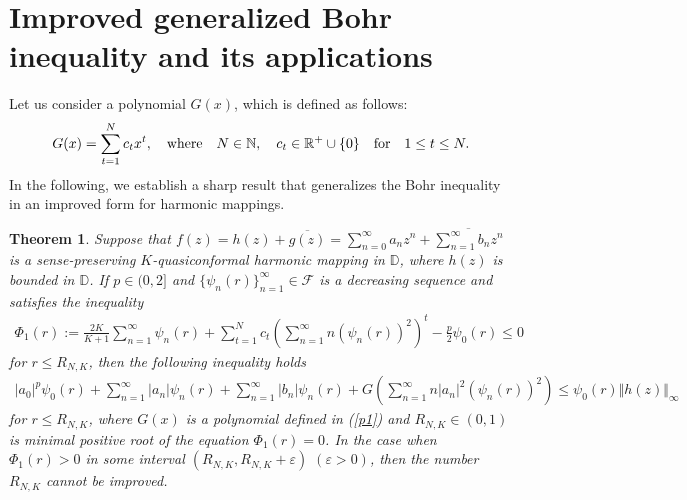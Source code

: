 \documentclass[11pt,reqno]{amsart}
\newtheorem{theo}{Theorem}[section]
\newtheorem{open problem}{Open problem}[section]
\newcommand{\F}{{\mathcal{F}}}
\newcommand{\N}{{\Bbb{N}}}
\newcommand{\R}{{\Bbb{R}}}
\newcommand{\ol}{\overline}
\newcommand{\beas}{\begin{eqnarray*}}
\newcommand{\eeas}{\end{eqnarray*}}
\newcommand{\bea}{\begin{eqnarray}}
\newcommand{\eea}{\end{eqnarray}}
\renewcommand{\epsilon}{\varepsilon}
\numberwithin{equation}{section}
\begin{document}
\section{Improved generalized Bohr inequality and its applications}
Let us consider a polynomial $G(x)$, which is defined as follows:
\bea\label{p1} G(x)=\sum_{t=1}^N c_t x^t,\quad \text{where}\quad N\in\N,\quad c_t\in\R^+\cup\{0\}\quad\text{for}\quad 1\leq t\leq N.\eea
In the following, we establish a sharp result that generalizes the Bohr inequality in an improved form for harmonic mappings.
\begin{theo}\label{T1} Suppose that $f(z)=h(z)+\ol{g(z)}=\sum_{n=0}^\infty a_n z^n+\ol{\sum_{n=1}^\infty b_n z^n}$ is a sense-preserving $K$-quasiconformal harmonic mapping in $\mathbb{D}$, where $h(z)$ is bounded in $\mathbb{D}$. If $p\in(0,2]$ and $\{\psi_n(r)\}_{n=1}^\infty\in\F$ is a decreasing sequence and satisfies the inequality
\bea\label{t1} 
\Phi_1(r):=\frac{2K}{K+1}\sum_{n=1}^\infty \psi_n(r)+\sum_{t=1}^N c_t\left(\sum_{n=1}^\infty n \left(\psi_n(r)\right)^2\right)^t-\frac{p}{2}\psi_0(r)\leq 0\eea
for $ r\leq R_{N,K}$, 
then the following inequality holds 
\beas |a_0|^p\psi_0(r)+\sum_{n=1}^\infty |a_n| \psi_n(r)+\sum_{n=1}^\infty |b_n| \psi_n(r)+G\left(\sum_{n=1}^\infty n|a_n|^2(\psi_n(r))^2\right)\leq \psi_0(r)\Vert h(z)\Vert_\infty\eeas
for $ r\leq R_{N,K}$,
where $G(x)$ is a polynomial defined in (\ref{p1}) and $R_{N,K}\in(0,1)$ is minimal positive root of the equation $\Phi_1(r)=0$.
In the case when $\Phi_1(r)>0$ in some interval $(R_{N,K}, R_{N,K}+\epsilon)$ $(\epsilon>0)$, then the number $R_{N,K}$ cannot be improved.
\end{theo}
\end{document}
